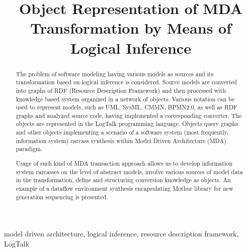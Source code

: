 \documentclass[conference]{IEEEtran}
\begin{document}
\title{Object Representation of MDA Transformation by Means of Logical Inference}


\author{
}




\maketitle

\begin{abstract} %
  The problem of software modeling having various models as sources and its transformation based on logical inference is considered.  Source models are converted into graphs of RDF (Resource Description Framework) and then processed with knowledge based system organized in a network of objects.  Various notation can be used to represent models, such as UML, SysML, CMMN, BPMN2.0, as well as RDF graphs and analyzed source code, having implemented a corresponding converter.  The objects are represented in the LogTalk programming language.  Objects query graphs and other objects implementing a scenario of a software system (most frequently, information system) carcass synthesis within Model Driven Architecture (MDA) paradigm.

  Usage of such kind of MDA transaction approach allows us to develop information system carcasses on the level of abstract models, involve various sources of model data in the transformation, define and structuring conversion knowledge as objects.  An example of a dataflow environment synthesis encapsulating Mothur library for new generation sequencing is presented.
\end{abstract}

\begin{IEEEkeywords}
model driven architecture, logical inference, resource description framework, LogTalk
\end{IEEEkeywords}
\end{document}

